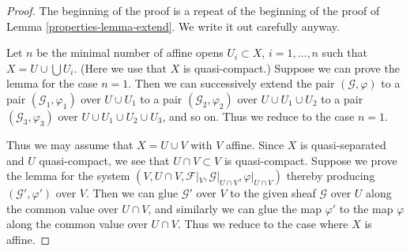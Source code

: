 \begin{proof}

The beginning of the proof is a repeat of the beginning of the
proof of Lemma \ref{properties-lemma-extend}. We write it out carefully anyway.

\medskip\noindent
Let $n$ be the minimal number of affine opens $U_i \subset X$,
$i = 1, \ldots , n$ such that $X = U \cup \bigcup U_i$.
(Here we use that $X$ is quasi-compact.) Suppose
we can prove the lemma for the case $n = 1$. Then we can successively
extend the pair $(\mathcal{G}, \varphi)$
to a pair $(\mathcal{G}_1, \varphi_1)$ over $U \cup U_1$
to a pair $(\mathcal{G}_2, \varphi_2)$ over $U \cup U_1 \cup U_2$
to a pair $(\mathcal{G}_3, \varphi_3)$ over $U \cup U_1 \cup U_2 \cup U_3$,
and so on.
Thus we reduce to the case $n = 1$.

\medskip\noindent
Thus we may assume that $X = U \cup V$ with $V$ affine.
Since $X$ is quasi-separated and $U$ quasi-compact,
we see that $U \cap V \subset V$ is quasi-compact.
Suppose we prove the lemma for the system
$(V, U \cap V, \mathcal{F}|_V, \mathcal{G}|_{U \cap V}, \varphi|_{U \cap V})$
thereby producing $(\mathcal{G}', \varphi')$ over $V$.
Then we can glue $\mathcal{G}'$ over $V$ to the given sheaf $\mathcal{G}$
over $U$ along the common value over $U \cap V$, and similarly we can glue
the map $\varphi'$ to the map $\varphi$ along the common value over
$U \cap V$. Thus we reduce to the case where $X$ is affine.


\end{proof}
